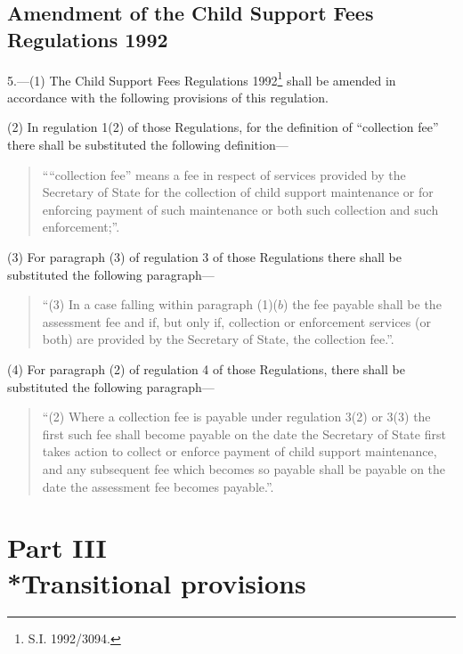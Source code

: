 \documentclass[a4paper]{article}
\newcommand{\parthead}{}
\begin{document}
\subsection[5. Amendment of the Child Support Fees Regulations 1992]{Amendment of the Child Support Fees Regulations 1992}

5.—(1) The Child Support Fees Regulations 1992\footnote{\frenchspacing S.I. 1992/3094.} shall be amended in accordance with the following provisions of this regulation.

(2) In regulation 1(2) of those Regulations, for the definition of “collection fee” there shall be substituted the following definition—
\begin{quotation}
““collection fee” means a fee in respect of services provided by the Secretary of State for the collection of child support maintenance or for enforcing payment of such maintenance or both such collection and such enforcement;”.
\end{quotation}

(3) For paragraph (3) of regulation 3 of those Regulations there shall be substituted the following paragraph—
\begin{quotation}
“(3) In a case falling within paragraph (1)($b$) the fee payable shall be the assessment fee and if, but only if, collection or enforcement services (or both) are provided by the Secretary of State, the collection fee.”.
\end{quotation}

(4) For paragraph (2) of regulation 4 of those Regulations, there shall be substituted the following paragraph—
\begin{quotation}
“(2) Where a collection fee is payable under regulation 3(2) or 3(3) the first such fee shall become payable on the date the Secretary of State first takes action to collect or enforce payment of child support maintenance, and any subsequent fee which becomes so payable shall be payable on the date the assessment fee becomes payable.”.
\end{quotation}

\section[Part III --- Transitional provisions]{Part III\\*Transitional provisions}

\renewcommand\parthead{--- Part III}
\end{document}
